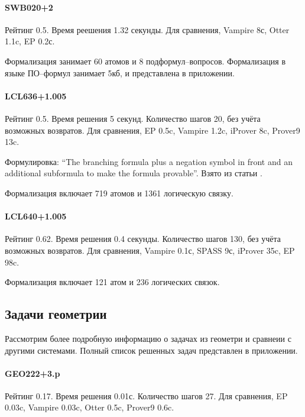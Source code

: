 \paragraph{SWB020+2}
Рейтинг 0.5. Время реешения 1.32 секунды. Для сравнения, Vampire 8с, Otter 1.1c, EP 0.2с.

Формализация занимает 60 атомов и 8 подформул--вопросов. Формализация в языке ПО--формул занимает 5кб, и представлена в приложении.

\paragraph{LCL636+1.005}
Рейтинг 0.5. Время решения 5 секунд. Количество шагов 20, без учёта возможных возвратов. Для сравнения, EP 0.5c, Vampire 1.2c, iProver 8c, Prover9 13c.

Формулировка: ``The branching formula plus a negation symbol in front and an additional subformula to make the formula provable''.
Взято из статьи \cite{SourceLCL}.

Формализация включает 719 атомов и 1361 логическую связку.


\paragraph{LCL640+1.005}
Рейтинг 0.62. Время решения 0.4 секунды. Количество шагов 130, без учёта возможных возвратов. Для сравнения, Vampire 0.1с, SPASS 9с, iProver 35c, EP 98c.

Формализация включает 121 атом и 236 логических связок.


\subsection{Задачи геометрии}
Рассмотрим более подробную информацию о задачах из геометри и сравнеии с другими системами. Полный список решенных задач представлен в приложении.

\paragraph{GEO222+3.p}
Рейтинг 0.17. Время решения 0.01с. Количество шагов 27. Для сравнения, EP 0.03c, Vampire 0.03c, Otter 0.5c, Prover9 0.6c.

